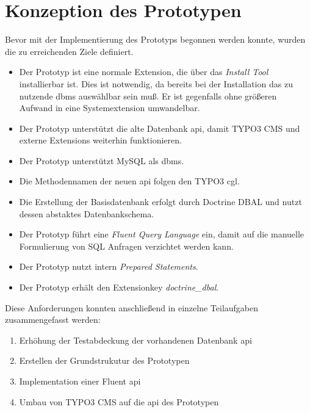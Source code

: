 \section{Konzeption des Prototypen}
\label{prototype:sec:concept}
Bevor mit der Implementierung des Prototyps begonnen werden konnte, wurden die zu erreichenden Ziele definiert.

\begin{itemize}
\item  Der Prototyp ist eine normale Extension, die über das \textit{Install Tool} installierbar ist. Dies ist notwendig, da bereits bei der Installation das zu nutzende \gls{dbms} auswählbar sein muß. Er ist gegenfalls ohne größeren Aufwand in eine Systemextension umwandelbar.

\item Der Prototyp unterstützt die alte Datenbank \gls{api}, damit TYPO3 CMS und externe Extensions weiterhin funktionieren.
\item Der Prototyp unterstützt MySQL als \gls{dbms}.
\item Die Methodennamen der neuen \gls{api} folgen den TYPO3 \gls{cgl}.
\item Die Erstellung der Basisdatenbank erfolgt durch Doctrine DBAL und nutzt dessen abstaktes Datenbankschema.
\item Der Prototyp führt eine \textit{Fluent Query Language} ein, damit auf die manuelle Formulierung von SQL Anfragen verzichtet werden kann.
\item Der Prototyp nutzt intern \textit{Prepared Statements}.
\item Der Prototyp erhält den Extensionkey \textit{doctrine\_dbal}.
\end{itemize}

Diese Anforderungen konnten anschließend in einzelne Teilaufgaben zusammengefasst werden:

\begin{enumerate}
\item Erhöhung der Testabdeckung der vorhandenen Datenbank \gls{api}
\item Erstellen der Grundstrukutur des Prototypen
\item Implementation einer Fluent \gls{api}
\item Umbau von TYPO3 CMS auf die \gls{api} des Prototypen
\end{enumerate}
